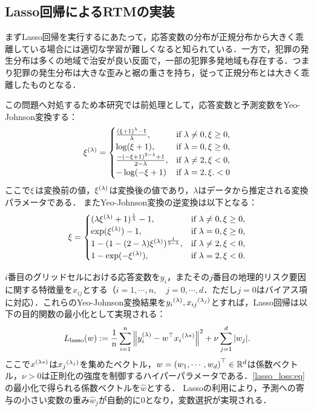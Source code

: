 \subsection{Lasso回帰によるRTMの実装}
まずLasso回帰を実行するにあたって，応答変数の分布が正規分布から大きく乖離している場合には適切な学習が難しくなると知られている\cite{islp, esl}．一方で，犯罪の発生分布は多くの地域で治安が良い反面で，一部の犯罪多発地域も存在する．つまり犯罪の発生分布は大きな歪みと裾の重さを持ち，従って正規分布とは大きく乖離したものとなる．
%

この問題へ対処するため本研究では前処理として，応答変数と予測変数をYeo-Johnson変換\cite{yeo}する：
\begin{equation*}\label{yeo:eq}
  {\xi}^{(\lambda)} =
   \begin{cases} 
   \frac{(\xi+1)^\lambda - 1}{\lambda}, & \text{if } \lambda \neq 0, \xi \geq 0,  \\ 
   \log(\xi+1), & \text{if } \lambda = 0, \xi \geq 0,   \\ 
   \frac{-(-\xi+1)^{2-\lambda} + 1}{2-\lambda}, & \text{if } \lambda \neq 2, \xi < 0,  \\ 
   -\log(-\xi+1) & \text{if } \lambda = 2, \xi. < 0
   \end{cases}
\end{equation*}
ここで$\xi$は変換前の値，${\xi}^{(\lambda)}$は変換後の値であり，$\lambda$はデータから推定される変換パラメータである．
またYeo-Johnson変換の逆変換は以下となる：
\begin{equation*}\label{yeo_inv:eq}
  \xi =
  \begin{cases} 
    (\lambda{\xi}^{(\lambda)}+1)^{\frac{1}{\lambda}}-1, & \text{if } \lambda \neq 0, \xi \geq 0,  \\ 
  \exp({\xi}^{(\lambda)})-1, & \text{if } \lambda = 0, \xi \geq 0,   \\ 
  1-(1-(2-\lambda){\xi}^{(\lambda)})^{\frac{1}{2-\lambda}}, & \text{if } \lambda \neq 2, \xi < 0,  \\ 
  1-\exp(-{\xi}^{(\lambda)}), & \text{if } \lambda = 2,  \xi < 0.
  \end{cases}
\end{equation*}

$i$番目のグリッドセルにおける応答変数を$y_i$，またその$j$番目の地理的リスク要因に関する特徴量を$x_{ij}$とする（$i=1,\cdots, n,\quad j=0,\cdots, d$．ただし$j=0$はバイアス項に対応）．これらのYeo-Johnson変換結果を${y_i}^{(\lambda)}, {x_{ij}}^{(\lambda_j)}$とすれば，Lasso回帰は以下の目的関数の最小化として実現される\cite{Lasso}：
\begin{align} \label{lasso_loss:eq}
  L_\mathrm{lasso}(w) := \frac{1}{n}\sum_{i=1}^n\left\|
    {y}^{(\lambda)}_i-{w}^\top{{x_i}^{(\lambda*)}}
    \right\|^2 + \nu\sum_{j=1}^{d}|w_j|. 
\end{align}
ここで${x}^{(\lambda*)}$は${x_j}^{(\lambda_j)}$を集めたベクトル，$w={(w_1, \cdots, w_d)}^\top\in\mathbb{R}^{d}$は係数ベクトル，$\nu>0$は正則化の強度を制御するハイパーパラメータである．\cref{lasso_loss:eq}の最小化で得られる係数ベクトルを$\hat w$とする．
Lassoの利用により，予測への寄与の小さい変数の重み$\hat w_j$が自動的に$0$となり，変数選択が実現される\cite{Lasso, islp, esl}．

